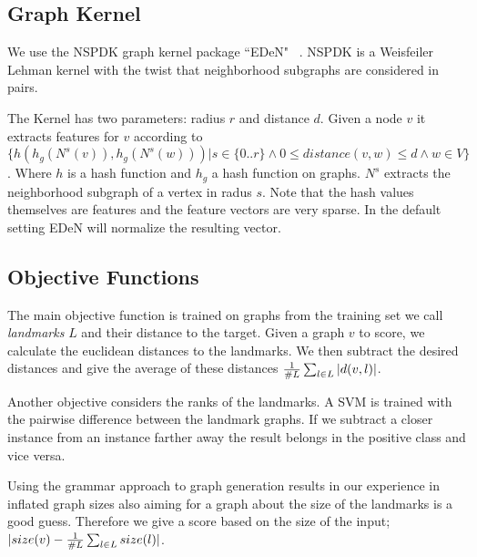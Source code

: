 \documentclass{esannV2} \usepackage[dvips]{graphicx}
\begin{document}

\subsection{Graph Kernel}
We use the NSPDK graph kernel package ``EDeN" ~\cite{costa2010fast}. NSPDK is a
Weisfeiler Lehman \cite{weisfeiler} kernel with the twist that neighborhood
subgraphs are considered in pairs.

The Kernel has two parameters: radius $r$ and distance $d$. Given a node $v$ it
extracts features for $v$ according to $\{ h(h_g(N^s(v)),h_g(N^s(w))) | s \in
\{0..r\} \wedge 0 \leq distance(v,w) \leq d  \wedge w\in V \}$.  Where $h$ is a
hash function and $h_g$ a hash function on graphs. $N^s$ extracts the
neighborhood subgraph of a vertex in radus $s$. Note that the hash values
themselves are features and the feature vectors are very sparse. In the default
setting EDeN will normalize the resulting vector.

\subsection{Objective Functions}

The main objective function is trained on graphs from the training set we call
\emph{landmarks} $L$ and their distance to the target.  Given a graph $v$ to
score, we calculate the euclidean distances to the landmarks. We then subtract
the desired distances and give the average of these distances $ {1 \over{\#L}
}\sum_{l \in L} |d(v,l)|$.

Another objective considers the ranks of the landmarks. A SVM is trained with
the pairwise difference between the landmark graphs. If we subtract a closer
instance from an instance farther away the result belongs in the positive class
and vice versa.

Using the grammar approach to graph generation results in our experience in
inflated graph sizes also aiming for a graph about the size of the landmarks is
a good guess.  Therefore we give a score based on the size of the input;
$|size(v) - {1\over{\#L}} \sum_{l \in L} size(l)|$.
\end{document}
